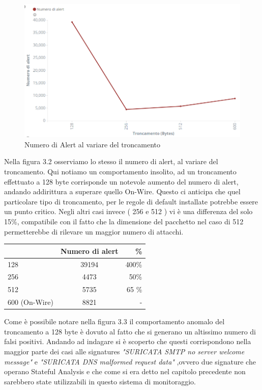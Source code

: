 \documentclass[12pt,a4paper,openright,twoside]{report}
\begin{document}
\begin{figure}[h!]
\begin{center}                          %
  \includegraphics[width=\textwidth]{images/DARPA-troncamento.png}
  \caption{Numero di Alert al variare del troncamento}
  \label{}
\end{center}
\end{figure}
Nella figura 3.2 osserviamo lo stesso il numero di alert, al variare del
troncamento. Qui notiamo un comportamento insolito, ad un troncamento effettuato
a 128 byte corrisponde un notevole aumento del numero di alert, andando addirittura a
superare quello On-Wire. Questo ci anticipa che quel particolare tipo di troncamento,
per le regole di default installate potrebbe essere un punto critico. Negli altri casi
invece ( 256 e 512 ) vi \`e una differenza del solo 15\%, compatibile con il fatto che
la dimensione del pacchetto nel caso di 512 permetterebbe di rilevare un maggior numero
di attacchi.
\begin{center}
  \begin{tabular}{| l | c | r |}
    \hline
    {\bf Troncamento (Bytes) & {\bf Numero di alert} & {\bf \%} \\ \hline
    128 & 39194 & 400\% \\ \hline
    256 & 4473 & 50\% \\ \hline
    512 & 5735 & 65 \% \\ \hline
    600 (On-Wire) & 8821 & - \\ \hline
  \end{tabular}
\end{center}

Come \`e possibile notare nella figura 3.3 il comportamento anomalo del troncamento
a 128 byte \`e dovuto al fatto che si generano un altissimo numero di falsi positivi.
Andando ad indagare si \`e scoperto che questi corrispondono nella maggior parte dei
casi alle signatures {\it "SURICATA SMTP no server welcome message"} e {\it "SURICATA DNS malformed request data"}
,ovvero due signature che operano Stateful Analysis e che come si era detto nel capitolo
precedente non sarebbero state utilizzabili in questo sistema di monitoraggio.
\end{document}
